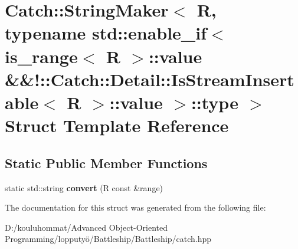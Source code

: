 \hypertarget{struct_catch_1_1_string_maker_3_01_r_00_01typename_01std_1_1enable__if_3_01is__range_3_01_r_01_4536d8fedfff6d62432b3dc59b56e1380}{}\section{Catch\+:\+:String\+Maker$<$ R, typename std\+:\+:enable\+\_\+if$<$ is\+\_\+range$<$ R $>$\+:\+:value \&\&!\+:\+:Catch\+:\+:Detail\+:\+:Is\+Stream\+Insertable$<$ R $>$\+:\+:value $>$\+:\+:type $>$ Struct Template Reference}
\label{struct_catch_1_1_string_maker_3_01_r_00_01typename_01std_1_1enable__if_3_01is__range_3_01_r_01_4536d8fedfff6d62432b3dc59b56e1380}
\subsection*{Static Public Member Functions}
\begin{DoxyCompactItemize}
\item 
\mbox{\label{struct_catch_1_1_string_maker_3_01_r_00_01typename_01std_1_1enable__if_3_01is__range_3_01_r_01_4536d8fedfff6d62432b3dc59b56e1380_ac6088db00103a7482fb9bc04b1603362}} 
static std\+::string {\bfseries convert} (R const \&range)
\end{DoxyCompactItemize}


The documentation for this struct was generated from the following file\+:\begin{DoxyCompactItemize}
\item 
D\+:/kouluhommat/\+Advanced Object-\/\+Oriented Programming/lopputyö/\+Battleship/\+Battleship/catch.\+hpp\end{DoxyCompactItemize}
